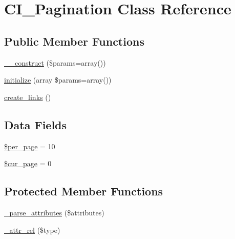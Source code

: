 \hypertarget{class_c_i___pagination}{}\section{C\+I\+\_\+\+Pagination Class Reference}
\label{class_c_i___pagination}
\subsection*{Public Member Functions}
\begin{DoxyCompactItemize}
\item 
\hyperlink{class_c_i___pagination_a568ecdb0d73d2a870f33189739922a50}{\+\_\+\+\_\+construct} (\$params=array())
\item 
\hyperlink{class_c_i___pagination_a37ac2c18c8af8852be6947397aa92275}{initialize} (array \$params=array())
\item 
\hyperlink{class_c_i___pagination_afd580f4d296b1d416d2b4b03edef3bc5}{create\+\_\+links} ()
\end{DoxyCompactItemize}
\subsection*{Data Fields}
\begin{DoxyCompactItemize}
\item 
\hyperlink{class_c_i___pagination_abece0f3099457a037f8f339811dc6e20}{\$per\+\_\+page} = 10
\item 
\hyperlink{class_c_i___pagination_a0114271d3cbbe963a73efe317e3512c7}{\$cur\+\_\+page} = 0
\end{DoxyCompactItemize}
\subsection*{Protected Member Functions}
\begin{DoxyCompactItemize}
\item 
\hyperlink{class_c_i___pagination_ac8d823533e1a045a789a197373fedf0b}{\+\_\+parse\+\_\+attributes} (\$attributes)
\item 
\hyperlink{class_c_i___pagination_a0ebda639ff890a52b36ca5eaf27275c0}{\+\_\+attr\+\_\+rel} (\$type)
\end{DoxyCompactItemize}
